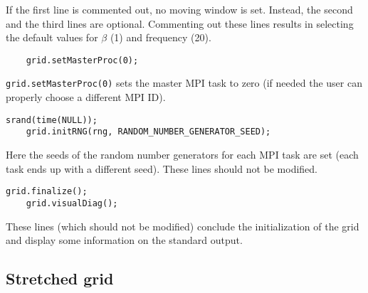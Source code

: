 \documentclass[11pt,a4paper]{report}
\begin{document}
If the first line is commented out, no moving window is set. Instead, the second and the third lines are optional. Commenting out these lines results in selecting the default values for $\beta$ (1) and frequency (20).
\begin{lstlisting}
	grid.setMasterProc(0);
\end{lstlisting}
\verb+grid.setMasterProc(0)+ sets the master MPI task to zero (if needed the user can properly choose a different MPI ID).
\begin{lstlisting}[backgroundcolor=\color{no_modify}]
	srand(time(NULL));
	grid.initRNG(rng, RANDOM_NUMBER_GENERATOR_SEED);
\end{lstlisting}
Here the seeds of the random number generators for each MPI task are set (each task ends up with a different seed). These lines should not be modified.
\begin{lstlisting}[backgroundcolor=\color{no_modify}]
	grid.finalize();
	grid.visualDiag();
\end{lstlisting}
These lines (which should not be modified) conclude the initialization of the grid and display some information on the standard output.


\subsection{Stretched grid}\label{subsection_stretch}
\end{document}
